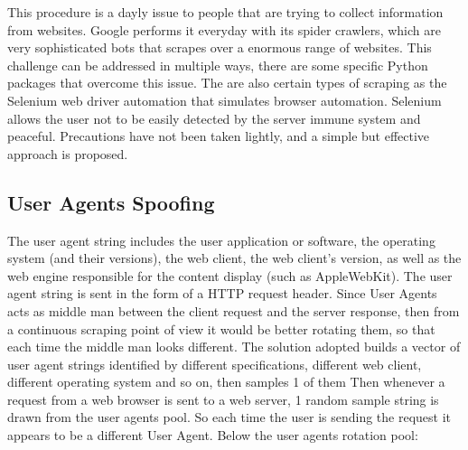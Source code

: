 \documentclass[
  12pt,
  a4paper,
  oneside]{book}
\theoremstyle{definition}
\theoremstyle{definition}
\theoremstyle{definition}
\theoremstyle{remark}
\begin{document}
This procedure is a dayly issue to people that are trying to collect information from websites. Google performs it everyday with its spider crawlers, which are very sophisticated bots that scrapes over a enormous range of websites. This challenge can be addressed in multiple ways, there are some specific Python packages that overcome this issue. The are also certain types of scraping as the Selenium web driver automation that simulates browser automation. Selenium allows the user not to be easily detected by the server immune system and peaceful. Precautions have not been taken lightly, and a simple but effective approach is proposed.

\hypertarget{spoofing}{%
\subsection{User Agents Spoofing}\label{spoofing}}

The user agent string includes the user application or software, the operating system (and their versions), the web client, the web client's version, as well as the web engine responsible for the content display (such as AppleWebKit). The user agent string is sent in the form of a HTTP request header. Since User Agents acts as middle man between the client request and the server response, then from a continuous scraping point of view it would be better rotating them, so that each time the middle man looks different. The solution adopted builds a vector of user agent strings identified by different specifications, different web client, different operating system and so on, then samples 1 of them
Then whenever a request from a web browser is sent to a web server, 1 random sample string is drawn from the user agents pool. So each time the user is sending the request it appears to be a different User Agent.
Below the user agents rotation pool:
\end{document}
